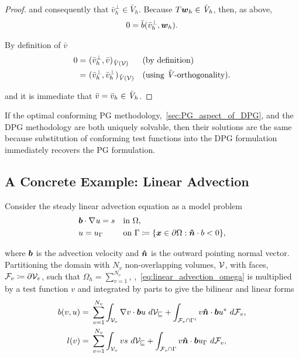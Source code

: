 \begin{proof}
and consequently that $\bar{v}_h^{\bot} \in \bar{V}_h$. Because $T\mathit{\bm{{w}}}_h \in \tilde{\mathit{{{V}}}}_h$, then, as above,
\begin{align}
0 = \bar{b}(\bar{v}_h^{\bot},\mathit{\bm{{w}}}_h).
\end{align}

By definition of $\bar{v}$
\begin{align}
0
=\ &
(\bar{v}_h^{\bot},\bar{v})_{\tilde{\mathit{{{V}}}}(\mathcal{{{V}}})} && (\text{by definition}) \nonumber \\
=\ &
(\bar{v}_h^{\bot},\bar{v}_h^{\bot})_{\tilde{\mathit{{{V}}}}(\mathcal{{{V}}})} && (\text{using}\ \tilde{\mathit{{{V}}}}\text{-orthogonality}). \nonumber
\end{align}

and it is immediate that $\bar{v} = \bar{v}_h \in \tilde{\mathit{{{V}}}}_h$.

\end{proof}

If the optimal conforming PG methodology,~\autoref{sec:PG_aspect_of_DPG}, and the DPG methodology are both uniquely
solvable, then their solutions are the same because substitution of conforming test functions into the DPG formulation
immediately recovers the PG formulation.

\subsection{A Concrete Example: Linear Advection}

Consider the steady linear advection equation as a model problem
\begin{subequations}
\begin{align}
& \varv{b} \cdot \nabla \vars{u} = s && \text{in}\ \Omega, \label{eq:linear_advection_omega} \\
& u = u_{\Gamma}\ && \text{on}\ \Gamma \coloneqq \{ \varv{x} \in \partial\Omega : \varv{\hat{n}} \cdot b < 0 \},
\end{align}
\end{subequations}

where $\mathit{\bm{{b}}}$ is the advection velocity and $\mathit{\bm{{\hat{n}}}}$ is the outward pointing normal vector. Partitioning the
domain with $N_v$ non-overlapping volumes, $\mathcal{{{V}}}$, with faces, $\mathcal{{{F}}}_v \coloneqq \partial \mathcal{{{V}}}_v$, such that
$\Omega_h = \sum_{v=1}^{N_v}$, ,~\eqref{eq:linear_advection_omega} is multiplied
by a test function $v$ and integrated by parts to give the bilinear and linear forms
\begin{subequations}
\begin{align}
b(v,u) 
=\ & \sum_{v=1}^{N_v} \int_{\fe{V}_v} \nabla v \cdot \varv{b} u\ d\fe{V_v} + \int_{\fe{F}_v \cap \Gamma^i} v
\varv{\hat{n}} \cdot \varv{b} u^*\ d\fe{F}_v, \label{eq:bilinear_pg_advection}\\
l(v)
=\ & \sum_{v=1}^{N_v} \int_{\fe{V}_v} v s\ d\fe{V_v} + \int_{\fe{F}_v \cap \Gamma} v \varv{\hat{n}} \cdot \varv{b}
u_{\Gamma}\ d\fe{F}_v,
\end{align}
\end{subequations}

